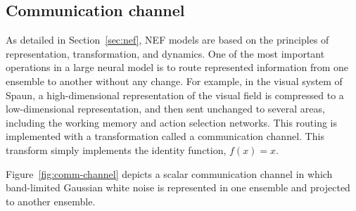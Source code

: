 \documentclass{frontiersSCNS}
\begin{document}
\subsection{Communication channel} \label{sec:comm-channel}


As detailed in Section~\ref{sec:nef},
NEF models are based on the principles
of representation, transformation, and dynamics.
One of the most important operations
in a large neural model is to route
represented information from
one ensemble to another without any change.
For example, in the visual system of Spaun,
a high-dimensional representation of the visual field
is compressed to a low-dimensional representation,
and then sent unchanged to several areas,
including the working memory
and action selection networks.
This routing is implemented
with a transformation
called a communication channel.
This transform simply implements
the identity function, $f(x) = x$.

Figure~\ref{fig:comm-channel}
depicts a scalar communication channel
in which band-limited Gaussian white noise
is represented in one ensemble
and projected to another ensemble.
\end{document}
